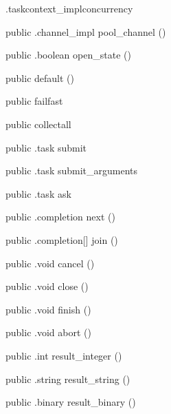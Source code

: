 \begin{CrexxClass}{.taskcontext\_impl}{concurrency}
\begin{Members}
    \Method
      {public}
      {.channel\_impl}
      {pool\_channel}
      {()}

    \Method
      {public}
      {.boolean}
      {open\_state}
      {()}

    \Factory
      {public}
      {default}
      {()}

    \Factory
      {public}
      {failfast}
      {}

    \Factory
      {public}
      {collectall}
      {}

    \Method
      {public}
      {.task}
      {submit}
      {}

    \Method
      {public}
      {.task}
      {submit\_arguments}
      {}

    \Method
      {public}
      {.task}
      {ask}
      {}

    \Method
      {public}
      {.completion}
      {next}
      {()}

    \Method
      {public}
      {.completion[]}
      {join}
      {()}

    \Method
      {public}
      {.void}
      {cancel}
      {()}

    \Method
      {public}
      {.void}
      {close}
      {()}

    \Method
      {public}
      {.void}
      {finish}
      {()}

    \Method
      {public}
      {.void}
      {abort}
      {()}

    \Method
      {public}
      {.int}
      {result\_integer}
      {()}

    \Method
      {public}
      {.string}
      {result\_string}
      {()}

    \Method
      {public}
      {.binary}
      {result\_binary}
      {()}


\end{Members}
\end{CrexxClass}

